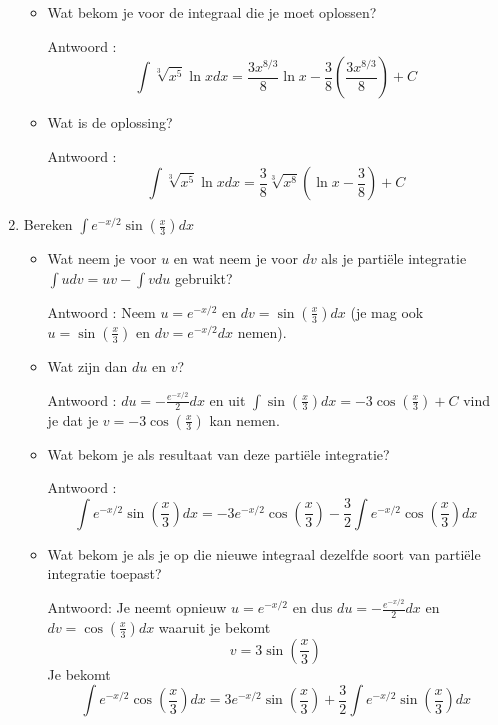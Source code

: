 \begin{enumerate}
\begin{itemize}
		\item Wat bekom je voor de integraal die je moet oplossen?
		
		Antwoord :  \begin{equation*}
		\int \sqrt[3]{x^5} \ln x dx=\frac{3x^{8/3}}{8} \ln x-\frac{3}{8}\left( \frac{3x^{8/3}}{8}  \right)+C
		\end{equation*}
		
		\item Wat is de oplossing?
		
		Antwoord :  \begin{equation*}
		\int \sqrt[3]{x^5} \ln x dx= \frac{3}{8} \sqrt[3]{x^8} \left( \ln x -\frac {3}{8}  \right) +C
		\end{equation*}
		
	\end{itemize}
	
	\item Bereken $\int e^{-x/2}\sin \left( \frac{x}{3}  \right)dx$
	
	\begin{itemize}
		
		\item Wat neem je voor $u$ en wat neem je voor $dv$ als je parti\"ele integratie $\int udv = uv -\int vdu$ gebruikt?
		
		Antwoord : Neem $u=e^{-x/2}$ en $dv=\sin \left( \frac{x}{3}  \right)dx$ (je mag ook $u=\sin \left( \frac{x}{3}  \right)$ en $dv=e^{-x/2}dx$ nemen).
		
		\item Wat zijn dan $du$ en $v$?
		
		Antwoord : $du=-\frac{e^{-x/2}}{2}dx$ en uit $\int \sin \left( \frac{x}{3}  \right)dx=-3 \cos \left( \frac{x}{3}  \right)+C$ vind je dat je $v=-3 \cos \left( \frac{x}{3}  \right)$ kan nemen.
		
		\item Wat bekom je als resultaat van deze parti\"ele integratie?
		
		Antwoord :  \begin{equation*}
		\int e^{-x/2}\sin \left( \frac{x}{3}  \right)dx=-3e^{-x/2} \cos \left( \frac{x}{3}  \right)-\frac{3}{2} \int e^{-x/2}\cos \left( \frac{x}{3}  \right)dx
		\end{equation*}
		
		\item Wat bekom je als je op die nieuwe integraal dezelfde soort van parti\"ele integratie toepast?
		
		Antwoord: Je neemt opnieuw $u=e^{-x/2}$ en dus $du=-\frac{e^{-x/2}}{2}dx$ en $dv=\cos \left( \frac{x}{3}  \right)dx$ waaruit je bekomt \begin{equation*}
		v=3 \sin \left( \frac{x}{3}  \right)
		\end{equation*}
		Je bekomt \begin{equation*}
		\int e^{-x/2}\cos \left( \frac{x}{3}  \right)dx=3e^{-x/2}\sin \left( \frac{x}{3}  \right)+\frac{3}{2}\int e^{-x/2}\sin \left( \frac{x}{3}  \right)dx
		\end{equation*}
		

\end{itemize}
\end{enumerate}
